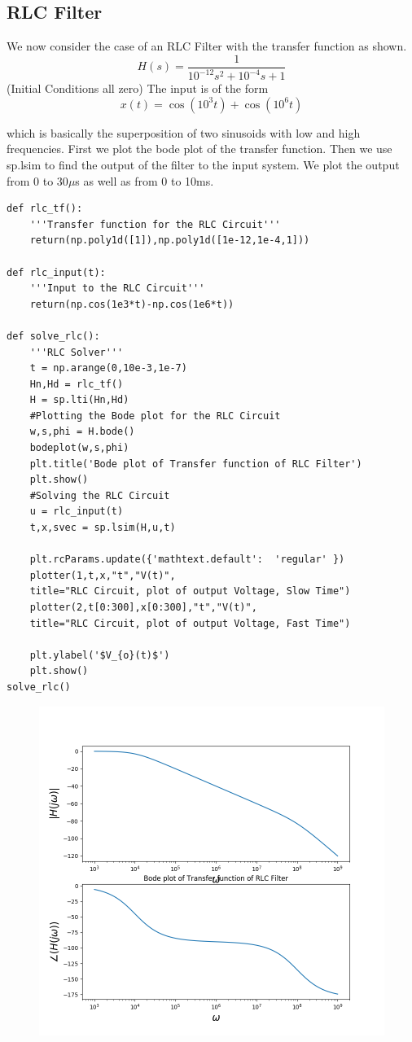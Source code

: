 \documentclass[11pt, a4paper]{article}
\begin{document}
\subsection{RLC Filter}
{
We now consider the case of an RLC Filter with the transfer function as shown.
\[ H(s) = \frac{1}{10^{-12}s^2 + 10^{-4}s + 1}\]
(Initial Conditions all zero)
The input is of the form
\[x(t) = \cos{(10^3t)}+\cos{(10^6t)} \]

which is basically the superposition of two sinusoids with low and high frequencies.
First we plot the bode plot of the transfer function.
Then we use sp.lsim to find the output of the filter to the input system.
We plot the output from 0 to 30$\mu$s as well as from 0 to 10ms.
}
\begin{verbatim}
def rlc_tf():
    '''Transfer function for the RLC Circuit'''
    return(np.poly1d([1]),np.poly1d([1e-12,1e-4,1]))

def rlc_input(t):
    '''Input to the RLC Circuit'''
    return(np.cos(1e3*t)-np.cos(1e6*t))

def solve_rlc():
    '''RLC Solver'''
    t = np.arange(0,10e-3,1e-7)
    Hn,Hd = rlc_tf()
    H = sp.lti(Hn,Hd)
    #Plotting the Bode plot for the RLC Circuit
    w,s,phi = H.bode()
    bodeplot(w,s,phi)
    plt.title('Bode plot of Transfer function of RLC Filter')
    plt.show()
    #Solving the RLC Circuit
    u = rlc_input(t)
    t,x,svec = sp.lsim(H,u,t)
    
    plt.rcParams.update({'mathtext.default':  'regular' })
    plotter(1,t,x,"t","V(t)",
    title="RLC Circuit, plot of output Voltage, Slow Time")
    plotter(2,t[0:300],x[0:300],"t","V(t)",
    title="RLC Circuit, plot of output Voltage, Fast Time")

    plt.ylabel('$V_{o}(t)$')
    plt.show()
solve_rlc()

\end{verbatim}
\begin{figure}[!tbh]
   	\centering
   	\includegraphics[scale=0.5]{img6.png}
   	\label{fig:32}
   \end{figure}
\end{document}
